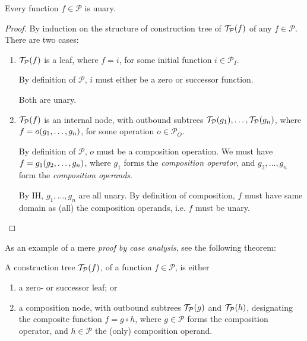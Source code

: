 \begin{theorem} \label{thm:p-functions-unary} Every function $f \in
\mathcal{P}$ is unary. \end{theorem}

\begin{proof} By induction on the structure of construction tree of
$\mathcal{T}_\mathcal{P}{\mathopen{}\left({f}\right)\mathclose{}}$ of any $f \in \mathcal{P}$. There are two
cases:\begin{enumerate}[label=(\arabic*)]

\item $\mathcal{T}_\mathcal{P}{\mathopen{}\left({f}\right)\mathclose{}}$ is a leaf, where $f = i$, for some initial
function $i \in \mathcal{P}_I$.

By definition of $\mathcal{P}$, $i$ must either be a zero or successor
function.

Both are unary.

\item $\mathcal{T}_\mathcal{P}{\mathopen{}\left({f}\right)\mathclose{}}$ is an internal node, with outbound subtrees
$\mathcal{T}_\mathcal{P}{\mathopen{}\left({g_1}\right)\mathclose{}}, \ldots, \mathcal{T}_\mathcal{P}{\mathopen{}\left({g_n}\right)\mathclose{}}$, where
$f = o{\mathopen{}\left({g_1, \ldots, g_n}\right)\mathclose{}}$, for some operation $o \in \mathcal{P}_O$.

By definition of $\mathcal{P}$, $o$ must be a composition operation. We must
have $f = g_1{\mathopen{}\left({g_2, \ldots, g_n}\right)\mathclose{}}$, where $g_1$ forms the \emph{composition
operator}, and $g_2, \ldots, g_n$ form the \emph{composition operands}.

By IH, $g_1, \ldots, g_n$ are all unary. By definition of composition, $f$ must
have same domain as (all) the composition operands, i.e. $f$ must be
unary.\end{enumerate}\end{proof}

As an example of a mere \emph{proof by case analysis}, see the following
theorem:

\begin{theorem} \label{thm:construction-tree-p} A construction tree
$\mathcal{T}_\mathcal{P}{\mathopen{}\left({f}\right)\mathclose{}}$, of a function $f \in \mathcal{P}$, is
either\begin{enumerate}[label=(\arabic*)]

\item a zero- or successor leaf; or

\item a composition node, with outbound subtrees $\mathcal{T}_\mathcal{P}{\mathopen{}\left({g}\right)\mathclose{}}$
and $\mathcal{T}_\mathcal{P}{\mathopen{}\left({h}\right)\mathclose{}}$, designating the composite function $f = g
\circ h$, where $g \in \mathcal{P}$ forms the composition operator, and $h \in
\mathcal{P}$ the (only) composition operand.

\end{enumerate}\end{theorem}

